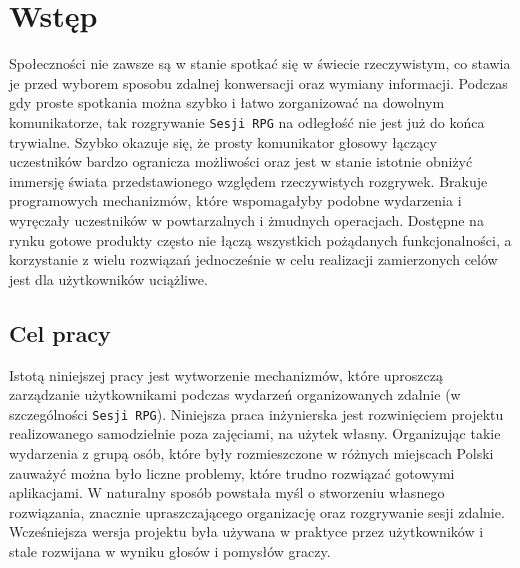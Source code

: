 \documentclass[shortabstract,inz]{iithesis}
\author{Mateusz Zając}
\begin{document}
	\chapter*{Wstęp}
		Społeczności nie zawsze są w stanie spotkać się w świecie rzeczywistym, co stawia je przed wyborem sposobu zdalnej konwersacji oraz wymiany informacji. Podczas gdy proste spotkania można szybko i łatwo zorganizować na dowolnym komunikatorze, tak rozgrywanie \texttt{Sesji RPG}\cite{sesjarpg} na odległość nie jest już do końca trywialne. Szybko okazuje się, że prosty komunikator głosowy łączący uczestników bardzo ogranicza możliwości oraz jest w stanie istotnie obniżyć immersję świata przedstawionego względem rzeczywistych rozgrywek. Brakuje programowych mechanizmów, które wspomagałyby podobne wydarzenia i wyręczały uczestników w powtarzalnych i żmudnych operacjach. Dostępne na rynku gotowe produkty często nie łączą wszystkich pożądanych funkcjonalności, a korzystanie z wielu rozwiązań jednocześnie w celu realizacji zamierzonych celów jest dla użytkowników uciążliwe. 
		
		\section*{Cel pracy}
		Istotą niniejszej pracy jest wytworzenie mechanizmów, które uproszczą zarządzanie użytkownikami podczas wydarzeń organizowanych zdalnie (w szczególności \texttt{Sesji RPG}).
		Niniejsza praca inżynierska jest rozwinięciem projektu realizowanego samodzielnie poza zajęciami, na użytek własny. Organizując takie wydarzenia z grupą osób, które były rozmieszczone w różnych miejscach Polski zauważyć można było liczne problemy, które trudno rozwiązać gotowymi aplikacjami. W naturalny sposób powstała myśl o stworzeniu własnego rozwiązania, znacznie upraszczającego organizację oraz rozgrywanie sesji zdalnie. Wcześniejsza wersja projektu była używana w praktyce przez użytkowników i stale rozwijana w wyniku głosów i pomysłów graczy.
		
\end{document}
